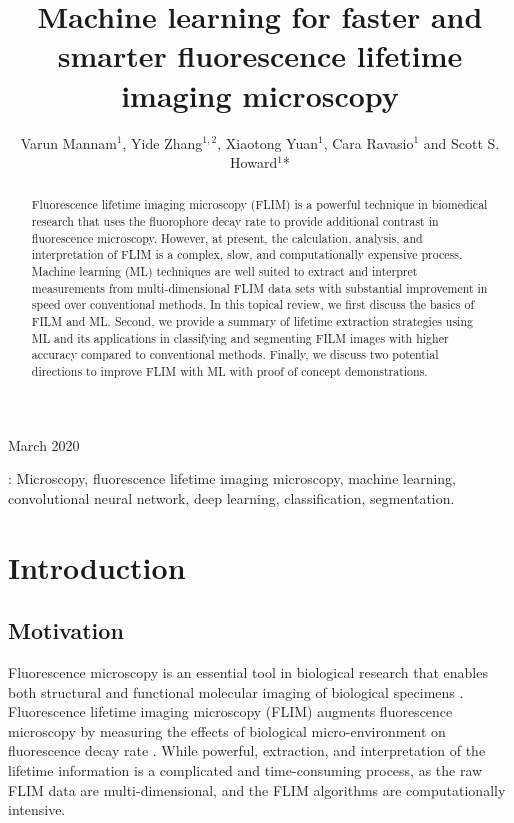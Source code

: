 \documentclass[12pt]{iopart}
\begin{document}
\title[Machine learning for FLIM]{Machine learning for faster and smarter fluorescence lifetime imaging microscopy}


\author{Varun Mannam$^1$, Yide Zhang$^{1,2}$, Xiaotong Yuan$^1$, Cara Ravasio$^1$ and Scott S. Howard$^1$*}
\address{$^1$Department of Electrical Engineering, University of Notre Dame, Notre Dame, IN 46556, USA}
\address{$^2$Caltech Optical Imaging Laboratory, Andrew and Peggy Cherng Department of Medical Engineering,  California Institute of Technology, Pasadena, CA 91125, USA}
\vspace{10pt}
\begin{indented}
\item[]March 2020
\end{indented}

\begin{abstract}
Fluorescence lifetime imaging microscopy (FLIM) is a powerful technique in biomedical research that uses the fluorophore decay rate to provide additional contrast in fluorescence microscopy. However, at present, the calculation, analysis, and interpretation of FLIM is a complex, slow, and computationally expensive process. Machine learning (ML) techniques are well suited to extract and interpret measurements from multi-dimensional FLIM data sets with substantial improvement in speed over conventional methods. In this topical review, we first discuss the basics of FILM and ML. Second, we provide a summary of lifetime extraction strategies using ML and its applications in classifying and segmenting FILM images with higher accuracy compared to conventional methods. Finally, we discuss two potential directions to improve FLIM with ML with proof of concept demonstrations.
\end{abstract}
\vspace{2pc}
: Microscopy, fluorescence lifetime imaging microscopy, machine learning, convolutional neural network, deep learning, classification, segmentation.

\section{Introduction}
\subsection{Motivation} \label{moto}
Fluorescence microscopy is an essential tool in biological research that enables both structural and functional molecular imaging of biological specimens \cite{FluorescenceMicroscopy}. Fluorescence lifetime imaging microscopy (FLIM) augments fluorescence microscopy by measuring the effects of biological micro-environment on fluorescence decay rate \cite{FLIM2007}. While powerful, extraction, and interpretation of the lifetime information is a complicated and time-consuming process, as the raw FLIM data are multi-dimensional, and the FLIM algorithms are computationally intensive.  
\end{document}
